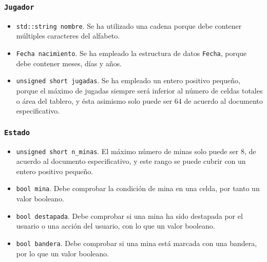 \documentclass[12pt]{article}
\begin{document}
\subsubsection*{\texttt{Jugador}}

\begin{itemize}

\item \texttt{std::string nombre}. Se ha utilizado una cadena porque
debe contener múltiples caracteres del alfabeto.

\item \texttt{Fecha nacimiento}. Se ha empleado la estructura de datos
\texttt{Fecha}, porque debe contener meses, días y años.

\item \texttt{unsigned short jugadas}. Se ha empleado un entero
positivo pequeño, porque el máximo de jugadas siempre será inferior al número de
celdas totales o área del tablero, y ésta asimismo solo puede ser 64 de acuerdo
al documento especificativo.

\end{itemize}

\subsubsection*{\texttt{Estado}}

\begin{itemize}

\item \texttt{unsigned short n_minas}. El máximo número de minas solo
puede ser 8, de acuerdo al documento especificativo, y este rango se puede
cubrir con un entero positivo pequeño.

\item \texttt{bool mina}. Debe comprobar la condición de mina en una
celda, por tanto un valor booleano.

\item \texttt{bool destapada}. Debe comprobar si una mina ha sido
destapada por el usuario o una acción del usuario, con lo que un valor booleano.

\item \texttt{bool bandera}. Debe comprobar si una mina está marcada
con una bandera, por lo que un valor booleano.

\end{itemize}
\end{document}
